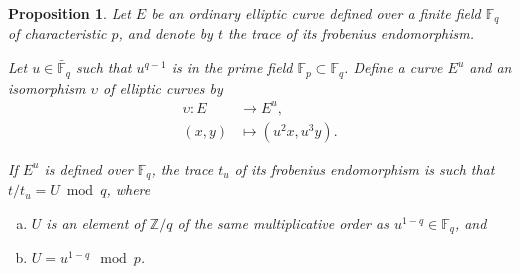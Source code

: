 \documentclass[12pt]{article}
\theoremstyle{plain}
\newtheorem{proposition}[theorem]{Proposition}
\theoremstyle{definition}
\def\Z{\ensuremath{\mathbb{Z}}}
\def\F{\ensuremath{\mathbb{F}}}
\begin{document}
\begin{proposition}
  \label{proposition:twisttrace}
  Let $E$ be an ordinary elliptic curve defined over a finite field
  $\F_q$ of characteristic $p$, and denote by $t$ the trace of its
  frobenius endomorphism.

  Let $u\in\bar{\F}_q$ such that $u^{q-1}$ is in the prime field
  $\F_p\subset\F_q$. Define a curve $E^u$ and an isomorphism
  $\upsilon$ of elliptic curves by
  \begin{equation*}
    \begin{aligned}
      \upsilon : E &\to E^u,\\
      (x,y) &\mapsto (u^2x,u^3y).
    \end{aligned}
  \end{equation*}
  
  If $E^u$ is defined over $\F_q$, the trace $t_u$ of its frobenius
  endomorphism is such that $t/t_u=U\bmod q$, where
  \begin{enumerate}[a)]
  \item $U$ is an element of $\Z/q$ of the same multiplicative order
    as $u^{1-q}\in\F_q$, and
  \item $U=u^{1-q}\mod p$.
  \end{enumerate}
\end{proposition}
\end{document}
